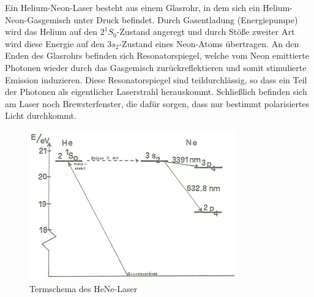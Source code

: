 Ein Helium-Neon-Laser besteht aus einem Glasrohr, in dem sich ein Helium-Neon-Gasgemisch unter Druck befindet. Durch Gasentladung (Energiepumpe) wird das Helium auf den $2^1 S_0$-Zustand angeregt und durch Stöße zweiter Art wird diese Energie auf den $3 s_2$-Zustand eines Neon-Atoms übertragen. An den Enden des Glasrohrs befinden sich Resonatorspiegel, welche vom Neon emittierte Photonen wieder durch das Gasgemisch zurückreflektieren und somit stimulierte Emission induzieren. Diese Resonatorspiegel sind teildurchlässig, so dass ein Teil der Photonen als eigentlicher Laserstrahl herauskommt. Schließlich befinden sich am Laser noch Brewsterfenster, die dafür sorgen, dass nur bestimmt polarisiertes Licht durchkommt.

\begin{figure}[H]
	\centering \includegraphics[width = 0.8\textwidth]{Bilder/henelaser.jpg}
	\caption{Termschema des HeNe-Laser}
\end{figure}

\clearpage

























